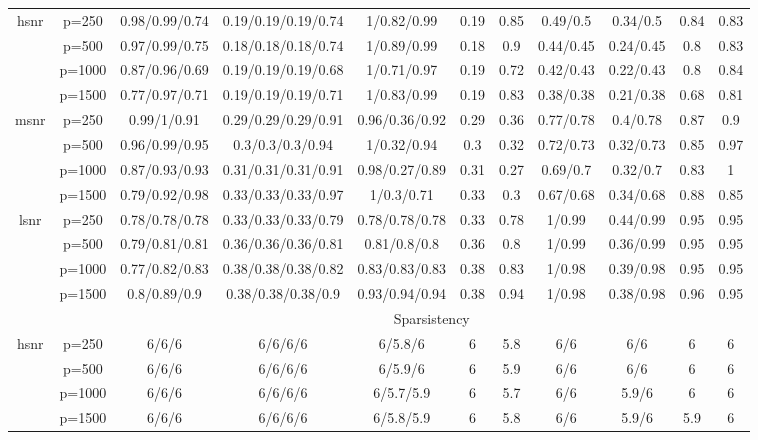 \begin{table}[ht]
{\begin{tabular}{|c|c|ccccccccc|}
\midrule\multirow{4}[2]{*}{hsnr} & p=250 & 0.98/0.99/0.74 & 0.19/0.19/0.19/0.74 & 1/0.82/0.99 & 0.19 & 0.85 & 0.49/0.5 & 0.34/0.5 & 0.84 & 0.83 \\ 
   & p=500 & 0.97/0.99/0.75 & 0.18/0.18/0.18/0.74 & 1/0.89/0.99 & 0.18 & 0.9 & 0.44/0.45 & 0.24/0.45 & 0.8 & 0.83 \\ 
   & p=1000 & 0.87/0.96/0.69 & 0.19/0.19/0.19/0.68 & 1/0.71/0.97 & 0.19 & 0.72 & 0.42/0.43 & 0.22/0.43 & 0.8 & 0.84 \\ 
   & p=1500 & 0.77/0.97/0.71 & 0.19/0.19/0.19/0.71 & 1/0.83/0.99 & 0.19 & 0.83 & 0.38/0.38 & 0.21/0.38 & 0.68 & 0.81 \\ 
  \midrule\multirow{4}[2]{*}{msnr} & p=250 & 0.99/1/0.91 & 0.29/0.29/0.29/0.91 & 0.96/0.36/0.92 & 0.29 & 0.36 & 0.77/0.78 & 0.4/0.78 & 0.87 & 0.9 \\ 
   & p=500 & 0.96/0.99/0.95 & 0.3/0.3/0.3/0.94 & 1/0.32/0.94 & 0.3 & 0.32 & 0.72/0.73 & 0.32/0.73 & 0.85 & 0.97 \\ 
   & p=1000 & 0.87/0.93/0.93 & 0.31/0.31/0.31/0.91 & 0.98/0.27/0.89 & 0.31 & 0.27 & 0.69/0.7 & 0.32/0.7 & 0.83 & 1 \\ 
   & p=1500 & 0.79/0.92/0.98 & 0.33/0.33/0.33/0.97 & 1/0.3/0.71 & 0.33 & 0.3 & 0.67/0.68 & 0.34/0.68 & 0.88 & 0.85 \\ 
  \midrule\multirow{4}[2]{*}{lsnr} & p=250 & 0.78/0.78/0.78 & 0.33/0.33/0.33/0.79 & 0.78/0.78/0.78 & 0.33 & 0.78 & 1/0.99 & 0.44/0.99 & 0.95 & 0.95 \\ 
   & p=500 & 0.79/0.81/0.81 & 0.36/0.36/0.36/0.81 & 0.81/0.8/0.8 & 0.36 & 0.8 & 1/0.99 & 0.36/0.99 & 0.95 & 0.95 \\ 
   & p=1000 & 0.77/0.82/0.83 & 0.38/0.38/0.38/0.82 & 0.83/0.83/0.83 & 0.38 & 0.83 & 1/0.98 & 0.39/0.98 & 0.95 & 0.95 \\ 
   & p=1500 & 0.8/0.89/0.9 & 0.38/0.38/0.38/0.9 & 0.93/0.94/0.94 & 0.38 & 0.94 & 1/0.98 & 0.38/0.98 & 0.96 & 0.95 \\ 
   \midrule 
 \multicolumn{1}{|c}{} &       & \multicolumn{9}{c|}{Sparsistency} \\
\midrule\multirow{4}[2]{*}{hsnr} & p=250 & 6/6/6 & 6/6/6/6 & 6/5.8/6 & 6 & 5.8 & 6/6 & 6/6 & 6 & 6 \\ 
   & p=500 & 6/6/6 & 6/6/6/6 & 6/5.9/6 & 6 & 5.9 & 6/6 & 6/6 & 6 & 6 \\ 
   & p=1000 & 6/6/6 & 6/6/6/6 & 6/5.7/5.9 & 6 & 5.7 & 6/6 & 5.9/6 & 6 & 6 \\ 
   & p=1500 & 6/6/6 & 6/6/6/6 & 6/5.8/5.9 & 6 & 5.8 & 6/6 & 5.9/6 & 5.9 & 6 \\ 

\end{tabular}}
\end{table}
